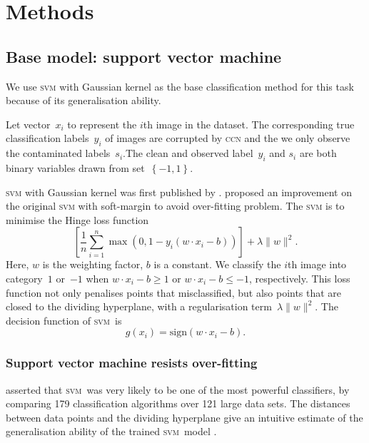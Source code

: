 \documentclass[12pt]{article} %
\newcommand{\svm}{\textsc{svm}}
\begin{document}
\section{Methods}\label{method}


\subsection{Base model: support vector machine}\label{sec:over}
We use \textsc{svm} with Gaussian kernel as the base classification method for this task because of its generalisation ability.

Let vector~$x_i$ to represent the $i$th image in the dataset. The corresponding true classification labels~$y_i$ of images are corrupted by \textsc{ccn} and the we only observe the contaminated labels~$s_i$.The clean and observed label~$y_i$ and $s_i$ are both binary variables drawn from set~$\left\{-1,1\right\}$. 

\textsc{svm} with Gaussian kernel was first published by \citet{Boser:1992:TAO:130385.130401}.
\citet{Cortes1995} proposed an improvement on the original \textsc{svm} with soft-margin  to  avoid over-fitting problem. The \textsc{svm} is to minimise the Hinge loss function
\begin{equation*}
\left[{\frac {1}{n}}\sum _{i=1}^{n}\max \left(0,1-y_{i}(w\cdot x_{i}-b)\right)\right]+\lambda \lVert w\rVert ^{2}.
\end{equation*}
Here, $w$ is the weighting factor, $b$ is a constant. We classify the $i$th image into category~$1$ or~$-1$ when $w\cdot x_{i}-b\geq1$ or $w\cdot x_{i}-b\leq-1$, respectively. This loss function not only penalises points that misclassified, but also points that are closed to the dividing hyperplane, with a regularisation term~$\lambda \lVert w\rVert ^{2}$. The decision function of \svm\ is
\begin{equation}\label{eq:decision}
 g(x_{i})=\text{sign}(w\cdot x_{i}-b).
\end{equation}

\subsubsection{Support vector machine resists over-fitting}\label{sec:over}
\citet{Fernandez-Delgado:2014:WNH:2627435.2697065} asserted that \svm\ was very likely to be one of the most powerful classifiers, by comparing 179 classification algorithms over 121 large data sets. The distances between data points and the dividing hyperplane give an intuitive estimate of the generalisation ability of the trained \svm\ model \citep{hastie01statisticallearning}.
\end{document}
